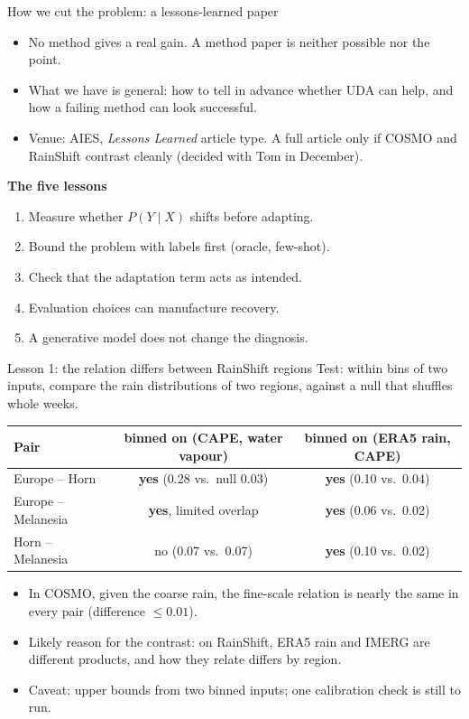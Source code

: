 \documentclass[11pt,aspectratio=169,xcolor=table]{beamer}
\newcommand{\yes}{\textbf{yes}}
\newcommand{\no}{no}
\begin{document}
\begin{frame}{How we cut the problem: a lessons-learned paper}
\begin{itemize}
  \item No method gives a real gain. A method paper is neither possible
        nor the point.
  \item What we have is general: how to tell in advance whether UDA can
        help, and how a failing method can look successful.
  \item Venue: AIES, \emph{Lessons Learned} article type. A full article
        only if COSMO and RainShift contrast cleanly (decided with Tom in
        December).
\end{itemize}
\medskip
\textbf{The five lessons}
\begin{enumerate}
  \item Measure whether $P(Y\mid X)$ shifts before adapting.
  \item Bound the problem with labels first (oracle, few-shot).
  \item Check that the adaptation term acts as intended.
  \item Evaluation choices can manufacture recovery.
  \item A generative model does not change the diagnosis.
\end{enumerate}
\end{frame}

\begin{frame}{Lesson 1: the relation differs between RainShift regions}
\small
Test: within bins of two inputs, compare the rain distributions of two
regions, against a null that shuffles whole weeks.

\medskip
\begin{tabular}{@{}lcc@{}}
\toprule
Pair & binned on (CAPE, water vapour) & binned on (ERA5 rain, CAPE) \\
\midrule
Europe -- Horn      & \yes{} (0.28 vs.\ null 0.03) & \yes{} (0.10 vs.\ 0.04) \\
Europe -- Melanesia & \yes{}, limited overlap      & \yes{} (0.06 vs.\ 0.02) \\
Horn -- Melanesia   & \no{} (0.07 vs.\ 0.07)       & \yes{} (0.10 vs.\ 0.02) \\
\bottomrule
\end{tabular}

\medskip
\begin{itemize}
  \item In COSMO, given the coarse rain, the fine-scale relation is nearly
        the same in every pair (difference $\leq 0.01$).
  \item Likely reason for the contrast: on RainShift, ERA5 rain and IMERG
        are different products, and how they relate differs by region.
  \item Caveat: upper bounds from two binned inputs; one calibration check
        is still to run.
\end{itemize}
\end{frame}
\end{document}

